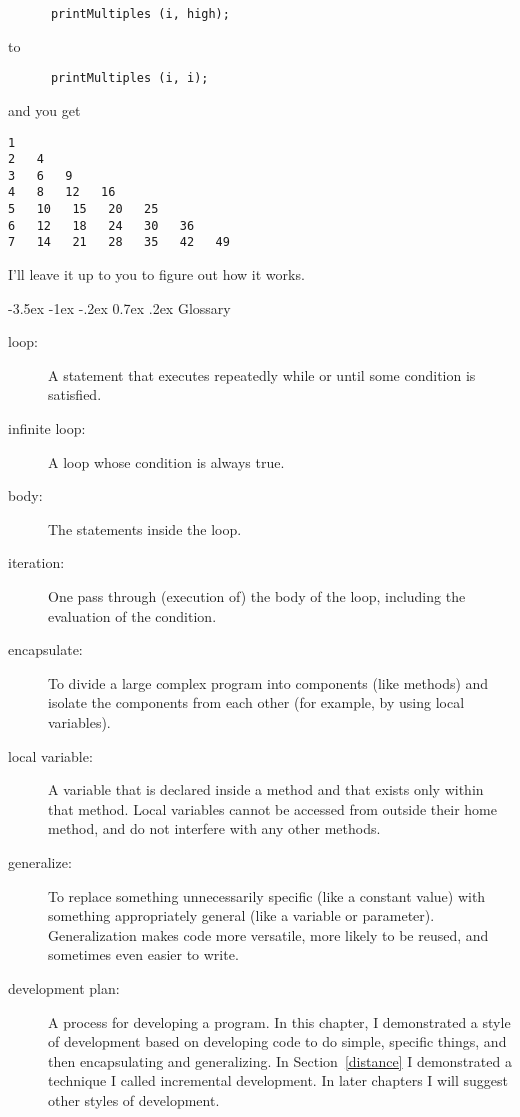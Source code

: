 \documentclass{book}
\makeatletter
\renewcommand{\section}{\@startsection 
    {section} {1} {0mm}%
    {-3.5ex \@plus -1ex \@minus -.2ex}%
    {0.7ex \@plus.2ex}%
    {\normalfont\Large\bfseries}}
\makeatother
\begin{document}
\begin{verbatim}
      printMultiples (i, high);
\end{verbatim}
%
to

\begin{verbatim}
      printMultiples (i, i);
\end{verbatim}
%
and you get

\begin{verbatim}
1   
2   4   
3   6   9   
4   8   12   16   
5   10   15   20   25   
6   12   18   24   30   36   
7   14   21   28   35   42   49  
\end{verbatim}
%
I'll leave it up to you to figure out how it works.

\section{Glossary}

\begin{description}

\item[loop:]  A statement that executes repeatedly while or
until some condition is satisfied.

\item[infinite loop:]  A loop whose condition is always true.

\item[body:]  The statements inside the loop.

\item[iteration:]  One pass through (execution of) the body
of the loop, including the evaluation of the condition.

\item[encapsulate:]  To divide a large complex program into
components (like methods) and isolate the components from
each other (for example, by using local variables).

\item[local variable:]  A variable that is declared inside
a method and that exists only within that method.  Local variables
cannot be accessed from outside their home method, and do not
interfere with any other methods.

\item[generalize:]  To replace something unnecessarily specific
(like a constant value) with something appropriately general
(like a variable or parameter).  Generalization makes code more
versatile, more likely to be reused, and sometimes even easier
to write.

\item[development plan:]  A process for developing a program.
In this chapter, I demonstrated a style of development based on
developing code to do simple, specific things, and then encapsulating
and generalizing.  In Section~\ref{distance} I demonstrated a
technique I called incremental development.  In later chapters I will
suggest other styles of development.


\end{description}
\end{document}
